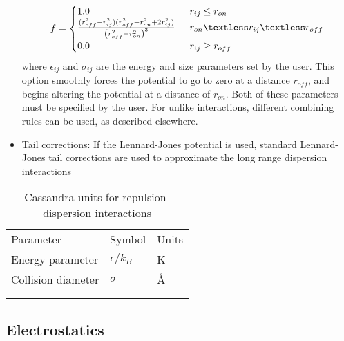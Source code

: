 \begin{itemize}
\begin{eqnarray}
	f = 
	\begin{cases}
	
		1.0 \, \, \, &  r_ {ij}  \le r_{on} \\
		\frac { (r_{off}^2 - r_{ij}^2) (r_{off}^2 - r_{on}^2 + 2r_{ij}^2)} {\left ( r_{off}^2 - r_{on}^2 \right )^3}  \, \, \,  & r_{on} \textless r_{ij} \textless r_{off}\\
		0.0 \, \, \, & r_{ij} \ge r_{off} 
		
	\end{cases}
\end{eqnarray}
where $\epsilon_{ij}$ and $\sigma_{ij}$ are the energy and size
parameters set by the user. This option smoothly forces the potential
to go to zero at a distance $r_{off}$, and begins altering the
potential at a distance of $r_{on}$. Both of these parameters must be
specified by the user. For unlike interactions, different 
combining rules can be used, as described elsewhere.

\item Tail corrections: If the Lennard-Jones potential is used, standard Lennard-Jones tail corrections are used to approximate the long range dispersion interactions

\end{itemize}

\begin{center}
\begin{table}[h]
	\begin{center}
	\caption{Cassandra units for repulsion-dispersion interactions}
	\begin{tabular} {l l l} \\ \hline \hline
	 Parameter & Symbol &  Units \\
	Energy parameter 	& $\epsilon/k_B$ & K \\
	Collision diameter &	 $\sigma$ & \AA \\ \\ \hline \\
	\end{tabular}
	\end{center}
	\label{Tab:LJ_Units}
\end{table}
\end{center}

\subsection{Electrostatics}\label{Sec:qq}

